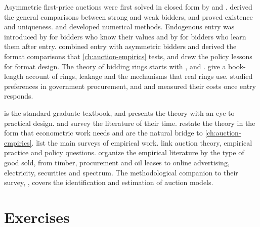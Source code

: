 Asymmetric first-price auctions were first solved in closed form by \citet{GriesmerLevitanShubik1967} and
\citet{Plum1992}. \citet{MaskinRiley2000} derived the general comparisons between strong and weak bidders, and
\citet{Lebrun1996,Lebrun1999} proved existence and uniqueness. \citet{MarshallEtAl1994} and \citet{Bajari2001}
developed numerical methods. Endogenous entry was introduced by \citet{Samuelson1985} for bidders who know their
values and by \citet{LevinSmith1994} for bidders who learn them after entry. \citet{AtheyLevinSeira2011} combined
entry with asymmetric bidders and derived the format comparisons that \cref{ch:auction-empirics} tests, and
\citet{Klemperer2002,Klemperer2004} drew the policy lessons for format design. The theory of bidding rings starts
with \citet{Robinson1985}, \citet{GrahamMarshall1987} and \citet{McAfeeMcMillan1992}. \citet{MarshallMarx2012}
give a book-length account of rings, leakage and the mechanisms that real rings use. \citet{McAfeeMcMillan1989}
studied preferences in government procurement, and \citet{Marion2007} and \citet{KrasnokutskayaSeim2011}
measured their costs once entry responds.

\citet{Krishna2010} is the standard graduate textbook, and \citet{Milgrom2004} presents the theory with an eye to
practical design. \citet{McAfeeMcMillan1987} and \citet{Klemperer1999} survey the literature of their time.
\citet{AtheyHaile2007} restate the theory in the form that econometric work needs and are the natural bridge to
\cref{ch:auction-empirics}. \citet[p.~84]{HortacsuPerrigne2021} list the main surveys of empirical work.
\citet{HendricksPorter2007} link auction theory, empirical practice and policy questions.
\citet{HortacsuPerrigne2021} organize the empirical literature by the type of good sold, from timber, procurement
and oil leases to online advertising, electricity, securities and spectrum. The methodological companion to
their survey, \citet{PerrigneVuong2021}, covers the identification and estimation of auction models.

\section{Exercises}\label{sec:14-exercises}

